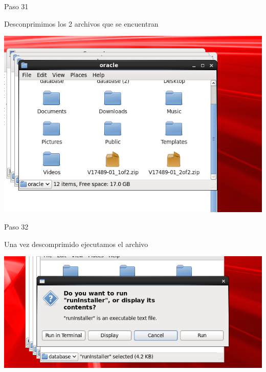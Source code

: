 \begin{itemize}
\begin{center}
    Paso 31
\end{center}

    Desconprimimos los 2 archivos que se encuentran\\
	\begin{center}
	\includegraphics[width=15cm]{./Imagenes/imagen31} 
	\end{center}

\end{itemize} 


\begin{itemize}
\begin{center}
    Paso 32
\end{center}

    Una vez descomprimido ejecutamos el archivo\\
	\begin{center}
	\includegraphics[width=15cm]{./Imagenes/imagen32} 
	\end{center}

\end{itemize} 
